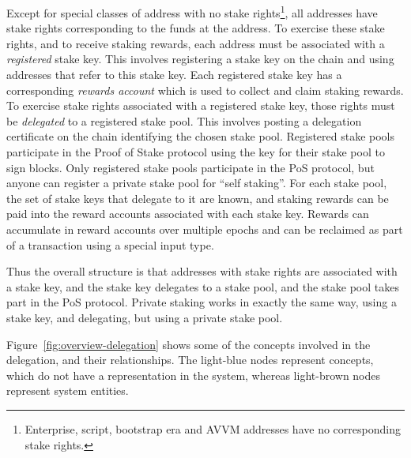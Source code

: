 \documentclass[11pt,a4paper]{article}
\begin{document}
Except for special classes of address with no stake rights\footnote{Enterprise,
  script, bootstrap era and AVVM addresses have no corresponding stake
  rights.}, all addresses have stake rights corresponding to the funds
at the address. To exercise these stake rights, and to receive staking
rewards, each address must be associated with a \emph{registered} stake
key. This involves registering a stake key on the chain and using
addresses that refer to this stake key. Each registered stake key has a
corresponding \emph{rewards account} which is used to collect and claim
staking rewards. To exercise stake rights associated with a registered
stake key, those rights must be \emph{delegated} to a registered stake pool.
This involves posting a delegation certificate on the chain identifying
the chosen stake pool. Registered stake pools participate in the Proof
of Stake protocol using the key for their stake pool to sign blocks.
Only registered stake pools participate in the PoS protocol, but anyone
can register a private stake pool for ``self staking''. For each stake
pool, the set of stake keys that delegate to it are known, and staking
rewards can be paid into the reward accounts associated with each stake
key. Rewards can accumulate in reward accounts over multiple epochs and
can be reclaimed as part of a transaction using a special input type.

Thus the overall structure is that addresses with stake rights are
associated with a stake key, and the stake key delegates to a stake
pool, and the stake pool takes part in the PoS protocol. Private staking
works in exactly the same way, using a stake key, and delegating, but
using a private stake pool.

Figure~\ref{fig:overview-delegation} shows some of the concepts involved in the
delegation, and their relationships. The light-blue nodes represent concepts, which
do not have a representation in the system, whereas light-brown nodes represent
system entities.
\end{document}
